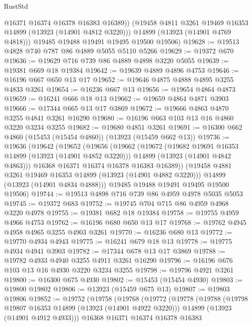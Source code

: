 \begin{lexlean}{RustStd}
\begin{coremodule}
            @16371
            @16374
            @16378
            @16383
            @16389))
        (@19458 @4811 @3261 @19469 @16353 @14899 (@13923 (@14901 @4812 @3220)))
        @14899
        (@13923 (@14901 @4769 @4818)))
      @19485
      @19488
      @19491
      @19495
      @19500
      @19506)
@19628 := @19513 @4828 @740 @787 @86 @4889 @5055 @5110 @5266
@19629 := @19372 @670
@19636 := @19629 @716 @739 @86 @4889 @4898 @3220 @5055
@19639 := @19381 @669 @18 @19384
@19642 := @19639 @4889 @4896 @4753
@19646 := @16196 @667 @650 @13 @17
@19652 := @19646 @4875 @4888 @4895 @3255 @4833 @3261
@19654 := @16236 @667 @13
@19656 := @19654 @4864 @4873
@19659 := @16241 @666 @18 @13
@19662 := @19659 @4864 @4871 @3903
@19666 := @17344 @665 @13 @17 @3869
@19672 := @19666 @4863 @4870 @3255 @4841 @3261 @16290
@19680 := @16196 @663 @103 @13 @16 @4860 @3220 @3234 @3255
@19682 := @19680 @4851 @3261
@19691 := @16300 @662 @4860 (@15453 (@15454 @4860)) (@13923 (@15459 @662 @13))
@19736 := @19636
    (@19642
      (@19652
        (@19656
          (@19662
            (@19672
              (@19682 @19691 @16353 @14899 (@13923 (@14901 @4852 @3220)))
              @14899
              (@13923 (@14901 @4842 @4863)))
            @16368
            @16371
            @16374
            @16378
            @16383
            @16389))
        (@19458 @4881 @3261 @19469 @16353 @14899 (@13923 (@14901 @4882 @3220)))
        @14899
        (@13923 (@14901 @4834 @4888)))
      @19485
      @19488
      @19491
      @19495
      @19500
      @19506)
@19744 := @19513 @4898 @716 @739 @86 @4959 @4978 @5035 @5053
@19745 := @19372 @683
@19752 := @19745 @704 @715 @86 @4959 @4968 @3220 @4978
@19755 := @19381 @682 @18 @19384
@19758 := @19755 @4959 @4966 @4753
@19762 := @16196 @680 @650 @13 @17
@19768 := @19762 @4945 @4958 @4965 @3255 @4903 @3261
@19770 := @16236 @680 @13
@19772 := @19770 @4934 @4943
@19775 := @16241 @679 @18 @13
@19778 := @19775 @4934 @4941 @3903
@19782 := @17344 @678 @13 @17 @3869
@19788 := @19782 @4933 @4940 @3255 @4911 @3261 @16290
@19796 := @16196 @676 @103 @13 @16 @4930 @3220 @3234 @3255
@19798 := @19796 @4921 @3261
@19800 := @16300 @675 @4930
@19802 := @15453 (@15454 @4930)
@19803 := @19800 @19802
@19806 := @13923 (@15459 @675 @13)
@19807 := @19803 @19806
@19852 := @19752
    (@19758
      (@19768
        (@19772
          (@19778
            (@19788
              (@19798 @19807 @16353 @14899 (@13923 (@14901 @4922 @3220)))
              @14899
              (@13923 (@14901 @4912 @4933)))
            @16368
            @16371
            @16374
            @16378
            @16383

\end{coremodule}
\end{lexlean}
